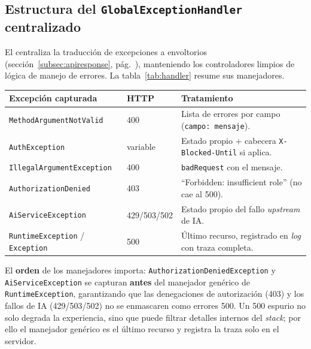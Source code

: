 \subsection{Estructura del \texttt{GlobalExceptionHandler} centralizado}
\label{subsec:global_handler}

El  centraliza la traducción de
excepciones a envoltorios  (sección~\ref{subsec:apiresponse},
pág.~\pageref{subsec:apiresponse}), manteniendo los controladores limpios de lógica de
manejo de errores. La tabla~\ref{tab:handler} resume sus manejadores.

\vspace{0.2cm}
\noindent
\renewcommand{\arraystretch}{1.3}
\fontsize{8.5}{10.2}\selectfont\sffamily
\begin{tabularx}{\textwidth}{|L{4.6cm}|C{1.6cm}|Y|}
\hline
{}
\sffamily\textbf{Excepción capturada} & \sffamily\textbf{HTTP} & \sffamily\textbf{Tratamiento} \\
\hline
\texttt{MethodArgumentNotValid} & 400 & Lista de errores por campo (\texttt{campo: mensaje}). \\
\hline
{}
\texttt{AuthException} & variable & Estado propio + cabecera \texttt{X-Blocked-Until} si aplica. \\
\hline
\texttt{IllegalArgumentException} & 400 & \texttt{badRequest} con el mensaje. \\
\hline
{}
\texttt{AuthorizationDenied} & 403 & ``Forbidden: insufficient role'' (no cae al 500). \\
\hline
\texttt{AiServiceException} & 429/503/502 & Estado propio del fallo \textit{upstream} de IA. \\
\hline
{}
\texttt{RuntimeException} / \texttt{Exception} & 500 & Último recurso, registrado en \textit{log} con traza completa. \\
\hline
\end{tabularx}
\label{tab:handler}

\begin{AlertaSeguridad}
El \textbf{orden} de los manejadores importa: \texttt{AuthorizationDeniedException} y
\texttt{AiServiceException} se capturan \textbf{antes} del manejador genérico de
\texttt{RuntimeException}, garantizando que las denegaciones de autorización (403) y los
fallos de IA (429/503/502) no se enmascaren como errores 500. Un 500 espurio no solo
degrada la experiencia, sino que puede filtrar detalles internos del \textit{stack}; por
ello el manejador genérico es el último recurso y registra la traza solo en el servidor.
\end{AlertaSeguridad}

